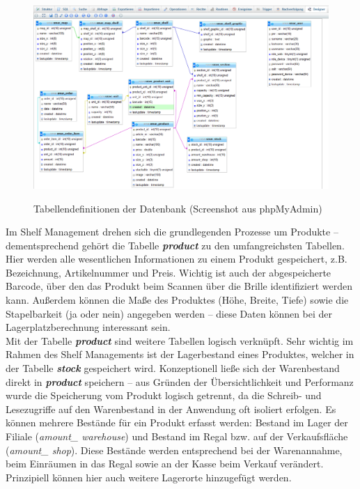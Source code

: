 \begin{figure}[H]
	\centering
	{\includegraphics[width=\textwidth]{Bilder/Abbildungen/architektur_datenbankschema.png}}
	\caption{Tabellendefinitionen der Datenbank (Screenshot aus phpMyAdmin)}
	\label{fig:architektur_datenbankschema}
\end{figure}

Im Shelf Management drehen sich die grundlegenden Prozesse um Produkte -- dementsprechend gehört die Tabelle \textit{\textbf{product}} zu den umfangreichsten Tabellen. Hier werden alle wesentlichen Informationen zu einem Produkt gespeichert, z.B. Bezeichnung, Artikelnummer und Preis. Wichtig ist auch der abgespeicherte Barcode, über den das Produkt beim Scannen über die Brille identifiziert werden kann. Außerdem können die Maße des Produktes (Höhe, Breite, Tiefe) sowie die Stapelbarkeit (ja oder nein) angegeben werden -- diese Daten können bei der Lagerplatzberechnung interessant sein.\\

Mit der Tabelle \textit{\textbf{product}} sind weitere Tabellen logisch verknüpft. Sehr wichtig im Rahmen des Shelf Managements ist der Lagerbestand eines Produktes, welcher in der Tabelle \textit{\textbf{stock}} gespeichert wird. Konzeptionell ließe sich der Warenbestand direkt in \textit{\textbf{product}} speichern -- aus Gründen der Übersichtlichkeit und Performanz wurde die Speicherung vom Produkt logisch getrennt, da die Schreib- und Lesezugriffe auf den Warenbestand in der Anwendung oft isoliert erfolgen. Es können mehrere Bestände für ein Produkt erfasst werden: Bestand im Lager der Filiale (\textit{amount\_ warehouse}) und Bestand im Regal bzw. auf der Verkaufsfläche (\textit{amount\_ shop}). Diese Bestände werden entsprechend bei der Warenannahme, beim Einräumen in das Regal sowie an der Kasse beim Verkauf verändert. Prinzipiell können hier auch weitere Lagerorte hinzugefügt werden.\\

